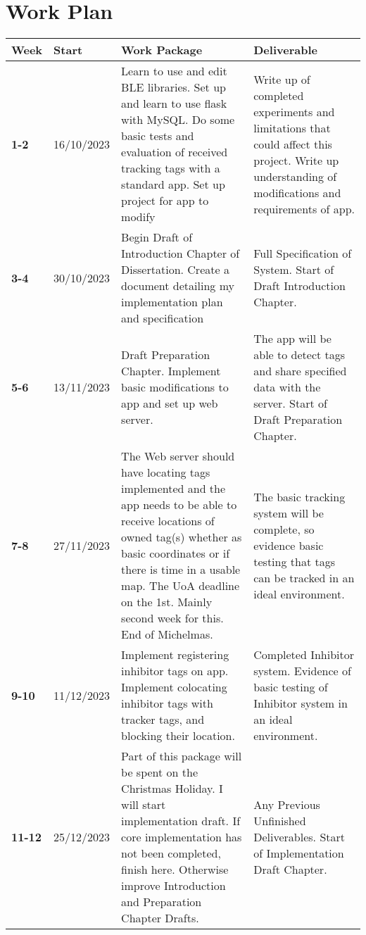 \documentclass{article}
\begin{document}
\pagebreak
\section{Work Plan}
\begin{table}[!ht]
    \raggedleft
\begin{tabular}{|l|l|p{7cm}|p{7cm}|}
   \hline
        \textbf{Week} & \textbf{Start} & \textbf{Work Package} & \textbf{Deliverable} \\ \hline
        \textbf{1-2} & 16/10/2023 & Learn to use and edit BLE libraries. Set up and learn to use flask with MySQL. Do some basic tests and evaluation of received tracking tags with a standard app. Set up project for app to modify & Write up of completed experiments and limitations that could affect this project. Write up understanding of modifications and requirements of app. \\ \hline
        \textbf{3-4} & 30/10/2023 & Begin Draft of Introduction Chapter of Dissertation. Create a document detailing my implementation plan and specification & Full Specification of System. Start of Draft Introduction Chapter. \\ \hline
        \textbf{5-6} & 13/11/2023 & Draft Preparation Chapter. Implement basic modifications to app and set up web server. & The app will be able to detect tags and share specified data  with the server.  Start of Draft Preparation Chapter. \\ \hline
        \textbf{7-8} & 27/11/2023 & The Web server should have locating tags implemented and the app needs to be able to receive locations of owned tag(s) whether as basic coordinates or if there is time in a usable map. The  UoA deadline on the 1st. Mainly second week for this. End of Michelmas. & The basic tracking system will be complete, so evidence basic testing that tags can be tracked in an ideal environment. \\ \hline
        \textbf{9-10} & 11/12/2023 & Implement registering inhibitor tags on app. Implement colocating inhibitor tags with tracker tags, and blocking their location. & Completed Inhibitor system. Evidence of basic testing of Inhibitor system in an ideal environment. \\ \hline
        \textbf{11-12} & 25/12/2023 & Part of this package will be spent on the Christmas Holiday.  I will start implementation draft. If core implementation has not been completed, finish here. Otherwise improve Introduction and Preparation Chapter Drafts. & Any Previous Unfinished Deliverables.  Start of Implementation Draft Chapter. \\ \hline

\end{tabular}
\end{table}
\end{document}
